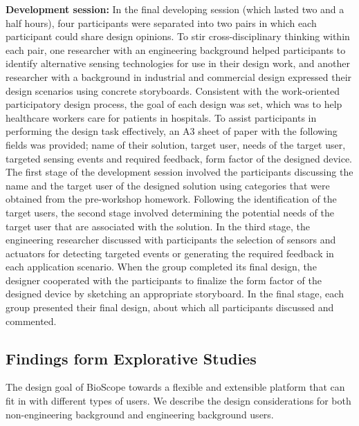 \textbf{Development session:} 
\newline
In the final developing session (which lasted two and a half hours), four participants were separated into two pairs in which each participant could share design opinions. To stir cross-disciplinary thinking within each pair, one researcher with an engineering background helped participants to identify alternative sensing technologies for use in their design work, and another researcher with a background in industrial and commercial design expressed their design scenarios using concrete storyboards. Consistent with the work-oriented participatory design process, the goal of each design was set, which was to help healthcare workers care for patients in hospitals. To assist participants in performing the design task effectively, an A3 sheet of paper with the following fields was provided; name of their solution, target user, needs of the target user, targeted sensing events and required feedback, form factor of the designed device. The first stage of the development session involved the participants discussing the name and the target user of the designed solution using categories that were obtained from the pre-workshop homework. Following the identification of the target users, the second stage involved determining the potential needs of the target user that are associated with the solution. In the third stage, the engineering researcher discussed with participants the selection of sensors and actuators for detecting targeted events or generating the required feedback in each application scenario. When the group completed its final design, the designer cooperated with the participants to finalize the form factor of the designed device by sketching an appropriate storyboard. In the final stage, each group presented their final design, about which all participants discussed and commented.

\subsection{Findings form Explorative Studies}
The design goal of BioScope towards a flexible and extensible platform that can fit in with different types of users. We describe the design considerations for both non-engineering background and engineering background users.

